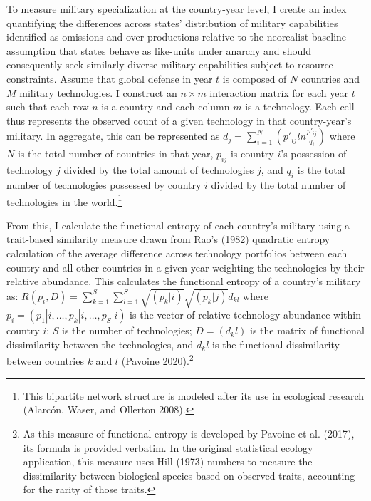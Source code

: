 \documentclass[
  12,
  letterpaper,
  DIV=11,
  numbers=noendperiod]{scrartcl}
\begin{document}
To measure military specialization at the country-year level, I create
an index quantifying the differences across states' distribution of
military capabilities identified as omissions and over-productions
relative to the neorealist baseline assumption that states behave as
like-units under anarchy and should consequently seek similarly diverse
military capabilities subject to resource constraints. Assume that
global defense in year \(t\) is composed of \(N\) countries and \(M\)
military technologies. I construct an \(n \times m\) interaction matrix
for each year \(t\) such that each row \(n\) is a country and each
column \(m\) is a technology. Each cell thus represents the observed
count of a given technology in that country-year's military. In
aggregate, this can be represented as
\(d_j = \sum_{i=1}^{N}(p'_{ij}ln\frac{p'_{ij}}{q_i})\) where \(N\) is
the total number of countries in that year, \(p_{ij}\) is country
\(i\)'s possession of technology \(j\) divided by the total amount of
technologies \(j\), and \(q_i\) is the total number of technologies
possessed by country \(i\) divided by the total number of technologies
in the world.\footnote{This bipartite network structure is modeled after
  its use in ecological research (Alarcón, Waser, and Ollerton 2008).}

From this, I calculate the functional entropy of each country's military
using a trait-based similarity measure drawn from Rao's (1982) quadratic
entropy calculation of the average difference across technology
portfolios between each country and all other countries in a given year
weighting the technologies by their relative abundance. This calculates
the functional entropy of a country's military as:
\(R(p_i,D) = \sum_{k=1}^{S} \sum_{l=1}^{S} \sqrt{(p_k|i)} \sqrt{(p_k|j)} d_{kl}\)
where \(p_i=(p_1|i, …, p_k|i, …, p_S|i)\) is the vector of relative
technology abundance within country \(i\); \(S\) is the number of
technologies; \(D=(d_kl)\) is the matrix of functional dissimilarity
between the technologies, and \(d_kl\) is the functional dissimilarity
between countries \(k\) and \(l\) (Pavoine 2020).\footnote{As this
  measure of functional entropy is developed by Pavoine et al. (2017),
  its formula is provided verbatim. In the original statistical ecology
  application, this measure uses Hill (1973) numbers to measure the
  dissimilarity between biological species based on observed traits,
  accounting for the rarity of those traits.}
\end{document}

